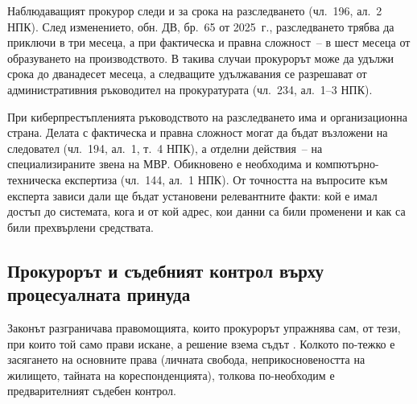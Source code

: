Наблюдаващият прокурор следи и за срока на разследването (чл.~196, ал.~2 НПК). След
изменението, обн. ДВ, бр.~65 от 2025~г., разследването трябва да приключи в три месеца, а
при фактическа и правна сложност~-- в шест месеца от образуването на производството. В
такива случаи прокурорът може да удължи срока до дванадесет месеца, а следващите
удължавания се разрешават от административния ръководител на прокуратурата (чл.~234,
ал.~1--3 НПК).

При киберпрестъпленията ръководството на разследването има и организационна страна.
Делата с фактическа и правна сложност могат да бъдат възложени на следовател (чл.~194,
ал.~1, т.~4 НПК), а отделни действия~-- на специализираните звена на МВР. Обикновено е
необходима и компютърно-техническа експертиза (чл.~144, ал.~1 НПК). От точността на
въпросите към експерта зависи дали ще бъдат установени релевантните факти: кой е имал
достъп до системата, кога и от кой адрес, кои данни са били променени и как са били
прехвърлени средствата.

\subsection{Прокурорът и съдебният контрол върху процесуалната принуда}
\label{sec:prinuda}

Законът разграничава правомощията, които прокурорът упражнява сам, от тези, при които той
само прави искане, а решение взема съдът . Колкото по-тежко е
засягането на основните права (личната свобода, неприкосновеността на жилището, тайната
на кореспонденцията), толкова по-необходим е предварителният съдебен контрол.

